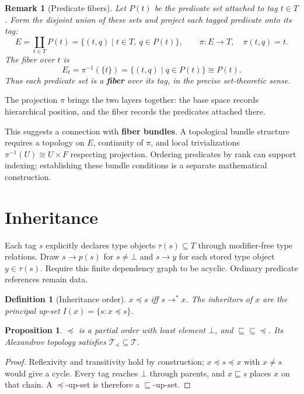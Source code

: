 \documentclass{article}
\newtheorem{definition}{Definition}[section]
\newtheorem{proposition}{Proposition}[section]
\newtheorem{remark}{Remark}[section]
\begin{document}
\begin{remark}[Predicate fibers]
Let $P(t)$ be the predicate set attached to tag $t \in T$. Form the
disjoint union of these sets and project each tagged predicate onto
its tag:
\[
  E=\coprod_{t\in T}P(t)
   =\{(t,q)\mid t\in T,\ q\in P(t)\},
  \qquad
  \pi:E\to T,\quad \pi(t,q)=t.
\]
The fiber over $t$ is
\[
  E_t=\pi^{-1}(\{t\})
     =\{(t,q)\mid q\in P(t)\}
     \cong P(t).
\]
Thus each predicate set is a \textbf{fiber} over its tag, in the precise
set-theoretic sense.
\end{remark}

The projection $\pi$ brings the two layers together: the base space records
hierarchical position, and the fiber records the predicates attached there.

This suggests a connection with \textbf{fiber bundles}. A topological
bundle structure requires a topology on $E$, continuity of $\pi$, and
local trivializations $\pi^{-1}(U)\cong U\times F$ respecting projection.
Ordering predicates by rank can support indexing; establishing these
bundle conditions is a separate mathematical construction.

\section{Inheritance}\label{sec:inheritance}

Each tag $s$ explicitly declares type objects $\tau(s)\subseteq T$ through
modifier-free type relations. Draw $s\to p(s)$ for $s\ne\bot$ and
$s\to y$ for each stored type object $y\in\tau(s)$. Require this finite
dependency graph to be acyclic. Ordinary predicate references remain data.

\begin{definition}[Inheritance order]
$x\preceq s$ iff $s\to^{*}x$. The inheritors of $x$ are the principal up-set
$I(x)=\{s:x\preceq s\}$.
\end{definition}

\begin{proposition}
$\preceq$ is a partial order with least element $\bot$, and
${\sqsubseteq}\subseteq{\preceq}$. Its Alexandrov topology satisfies
$\mathcal T_{\preceq}\subseteq\mathcal T$.
\end{proposition}
\begin{proof}
Reflexivity and transitivity hold by construction; $x\preceq s\preceq x$
with $x\ne s$ would give a cycle. Every tag reaches $\bot$ through parents,
and $x\sqsubseteq s$ places $x$ on that chain. A $\preceq$-up-set is
therefore a $\sqsubseteq$-up-set.
\end{proof}
\end{document}
